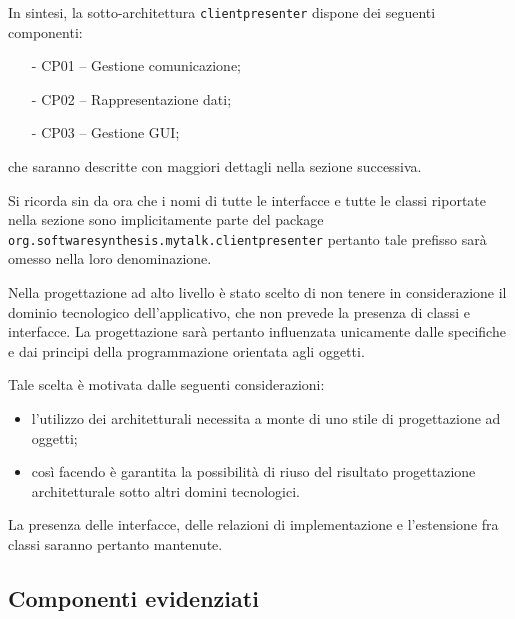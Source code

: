 In sintesi, la sotto-architettura \texttt{clientpresenter} dispone dei seguenti componenti:
\begin{itemize}[noitemsep,nolistsep]
	\item[-] \textsf{CP01 -- Gestione comunicazione};
	\item[-] \textsf{CP02 -- Rappresentazione dati};
	\item[-] \textsf{CP03 -- Gestione GUI};
\end{itemize}
che saranno descritte con maggiori dettagli nella sezione successiva.

Si ricorda sin da ora che i nomi di tutte le interfacce e tutte le classi riportate nella sezione sono implicitamente parte del package \texttt{org.softwaresynthesis.mytalk.clientpresenter} pertanto tale prefisso sarà omesso nella loro denominazione.

Nella progettazione ad alto livello è stato scelto di non tenere in considerazione il dominio tecnologico dell'applicativo, che non prevede la presenza di classi e interfacce. La progettazione sarà pertanto influenzata unicamente dalle specifiche e dai principi della programmazione orientata agli oggetti.

Tale scelta è motivata dalle seguenti considerazioni:
\begin{itemize}
   \item l'utilizzo dei  architetturali necessita a monte di uno stile di progettazione ad oggetti;
   \item così facendo è garantita la possibilità di riuso del risultato progettazione architetturale sotto altri domini tecnologici.
\end{itemize}

La presenza delle interfacce, delle relazioni di implementazione e l'estensione fra classi saranno pertanto mantenute.

\subsection{Componenti evidenziati}

